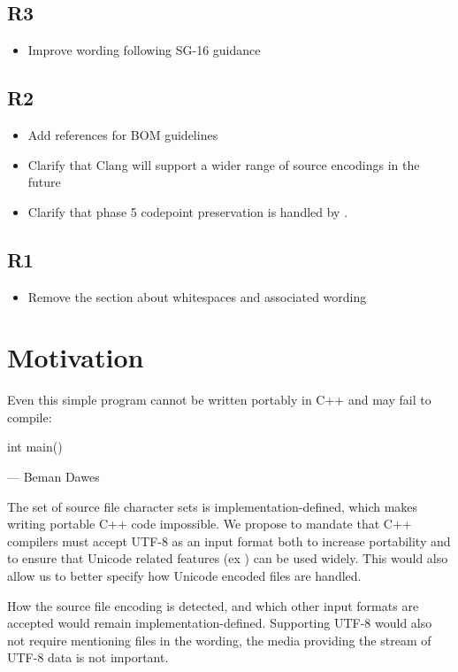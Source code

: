 \documentclass{wg21}
\begin{document}
\subsection{R3}
\begin{itemize}
\item Improve wording following SG-16 guidance
\end{itemize}

\subsection{R2}
\begin{itemize}
    \item Add references for BOM guidelines
    \item Clarify that Clang will support a wider range of source encodings in the future
    \item Clarify that phase 5 codepoint preservation is handled by .
\end{itemize}

\subsection{R1}
\begin{itemize}
    \item Remove the section about whitespaces and associated wording
\end{itemize}

\section{Motivation}

\begin{quoteblock}
    Even this simple program cannot be written portably in C++ and may fail to compile:
\begin{codeblock}
    int main() {}
\end{codeblock}
 --- Beman Dawes
\end{quoteblock}

The set of source file character sets is implementation-defined, which makes writing portable C++ code impossible.
We propose to mandate that C++ compilers must accept UTF-8 as an input format both to increase portability and
to ensure that Unicode related features (ex ) can be used widely.
This would also allow us to better specify how Unicode encoded files are handled.

How the source file encoding is detected, and which other input formats are accepted would remain implementation-defined.
Supporting UTF-8 would also not require mentioning files in the wording, the media providing the stream of UTF-8 data is not important.
\end{document}
